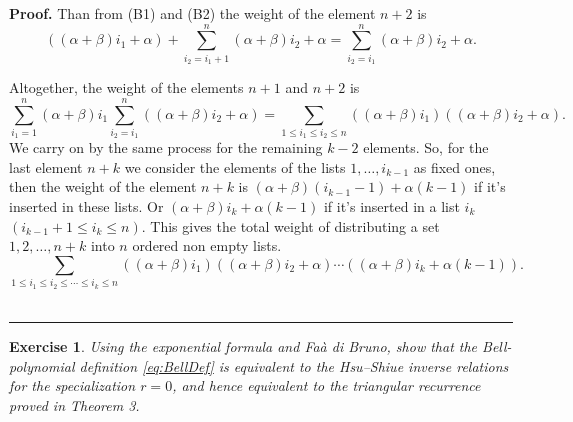 \documentclass{article}
\newtheorem{exercise}[theorem]{Exercise}
\newenvironment{proof}[1][Proof]{\noindent\textbf{#1.} }{\ \rule{0.5em}{0.5em}}
\begin{document}
\begin{proof}
Than from (B1) and (B2) the weight of the element $n+2$ is
  \begin{equation*}
  \left( \left( \alpha +\beta \right) i_{1}+\alpha \right) +\sum_{i_{2}=i_{1}+1}^{n}\left( \alpha +\beta \right)i_{2}+\alpha= \sum_{i_{2}=i_{1}}^{n}\left( \alpha +\beta \right)i_{2}+\alpha.
  \end{equation*}


Altogether, the weight of the elements $n+1$ and $n+2$ is
\begin{equation*}
\sum_{i_{1}=1}^{n}\left(  \alpha +\beta \right) i_{1}\sum_{i_{2}=i_{1}}^{n}\left( \left( \alpha +\beta \right) i_{2}+\alpha
\right) =\sum_{1\leq i_{1}\leq i_{2}\leq n}\left( \left( \alpha
+\beta \right) i_{1}\right) \left( \left( \alpha +\beta \right) i_{2}+\alpha
\right).
\end{equation*}
We carry on by the same process for the remaining $k-2$ elements. So, for
the last element $n+k$ we consider the elements of the lists $1,\ldots
,i_{k-1}$ as fixed ones, then the weight of the element $n+k$ is  $\left( \alpha +\beta \right)
(i_{k-1}-1)+\alpha (k-1)$ if it's inserted in these lists. Or $\left( \alpha +\beta \right) i_{k}+\alpha (k-1)$
if it's inserted in a list $i_{k}$ $\left( i_{k-1}+1\leq i_{k}\leq n\right) $. This gives the total weight of distributing a set $1,2,\ldots,n+k$ into $n$ ordered non empty lists.
\begin{equation*}
\sum_{1\leq i_{1}\leq i_{2}\leq \cdots \leq i_{k}\leq n}\left( \left( \alpha
+\beta \right) i_{1}\right) \left( \left( \alpha +\beta \right) i_{2}+\alpha
\right) \cdots \left( \left( \alpha +\beta \right) i_{k}+\alpha \left(
k-1\right) \right).
\end{equation*}
\end{proof}

\begin{exercise}
Using the exponential formula and Fa\`a di Bruno, show that the Bell-polynomial definition \eqref{eq:BellDef} is equivalent to the Hsu--Shiue inverse relations for the specialization $r=0$, and hence equivalent to the triangular recurrence proved in Theorem 3.
\end{exercise}

% 
% 

\end{document}

